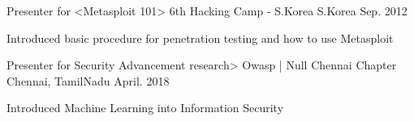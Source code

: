 

\begin{cventries}


  \cventry
    {Presenter for <Metasploit 101>} %
    {6th Hacking Camp - S.Korea} %
    {S.Korea} %
    {Sep. 2012} %
    {
      \begin{cvitems} %
        \item {Introduced basic procedure for penetration testing and how to use Metasploit}
      \end{cvitems}
    }

  \cventry
    {Presenter for Security Advancement research>} %
    {Owasp | Null Chennai Chapter} %
    {Chennai, TamilNadu} %
    {April. 2018} %
    {
      \begin{cvitems} %
        \item {Introduced Machine Learning into Information Security}
      \end{cvitems}
    }

\end{cventries}
